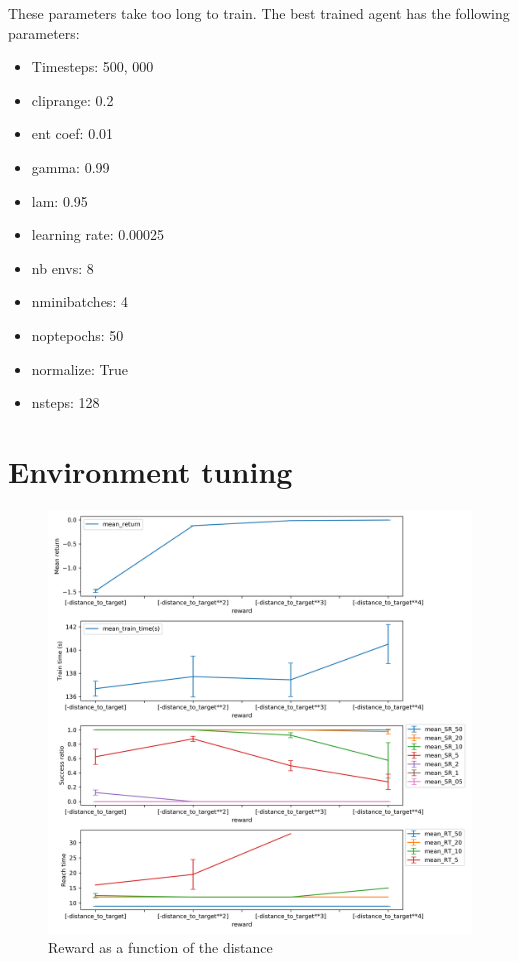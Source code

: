 \documentclass{article}
\begin{document}
These parameters take too long to train. The best trained agent has the following parameters:

\begin{itemize}
  \item Timesteps: 500, 000
  \item cliprange: 0.2
  \item ent coef: 0.01
  \item gamma: 0.99
  \item lam: 0.95
  \item learning rate: 0.00025
  \item nb envs: 8
  \item nminibatches: 4
  \item noptepochs: 50
  \item normalize: True
  \item nsteps: 128
\end{itemize} 


\section{Environment tuning}


\begin{figure}[H]
    \centering
    \includegraphics[width=\textwidth]{../reward_dist.png}
\caption{Reward as a function of the distance}
\end{figure}
\end{document}
